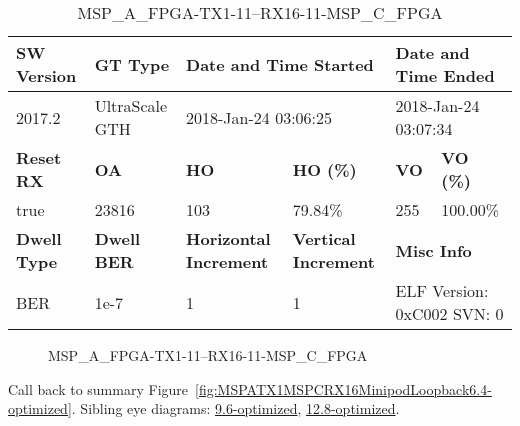 \begin{table}[h]
\centering
\caption{MSP\_A\_FPGA-TX1-11--RX16-11-MSP\_C\_FPGA}
\label{tab:MSPAFPGATX111RX1611MSPCFPGA6.4-optimized}
\begin{tabular}{@{}|l|l|l|l|l|l|@{}}
\toprule
\textbf{SW Version}                & \textbf{GT Type}   & \multicolumn{2}{l|}{\textbf{Date and Time Started}}            & \multicolumn{2}{l|}{\textbf{Date and Time Ended}}        \\ \midrule
2017.2                       & UltraScale GTH          & \multicolumn{2}{l|}{2018-Jan-24 03:06:25}                   & \multicolumn{2}{l|}{2018-Jan-24 03:07:34}               \\ \midrule
\textbf{Reset RX}                  & \textbf{OA} & \textbf{HO}   & \textbf{HO (\%)} & \textbf{VO} & \textbf{VO (\%)} \\ \midrule
true & 23816        & 103          & 79.84\%        & 255        & 100.00\%       \\ \midrule
\textbf{Dwell Type}                & \textbf{Dwell BER} & \textbf{Horizontal Increment} & \textbf{Vertical Increment}    & \multicolumn{2}{l|}{\textbf{Misc Info}}                  \\ \midrule
BER                            & 1e-7        & 1        & 1           & \multicolumn{2}{l|}{ELF Version: 0xC002 SVN: 0}                         \\ \bottomrule
\end{tabular}
\end{table}

\begin{figure}[h]
\caption{MSP\_A\_FPGA-TX1-11--RX16-11-MSP\_C\_FPGA} \label{fig:MSPAFPGATX111RX1611MSPCFPGA6.4-optimized}
\end{figure}

Call back to summary Figure~\ref{fig:MSPATX1MSPCRX16MinipodLoopback6.4-optimized}.
Sibling eye diagrams: \hyperref[sec:MSPAFPGATX111RX1611MSPCFPGA9.6-optimized]{9.6-optimized}, \hyperref[sec:MSPAFPGATX111RX1611MSPCFPGA12.8-optimized]{12.8-optimized}.

\clearpage
\newpage

